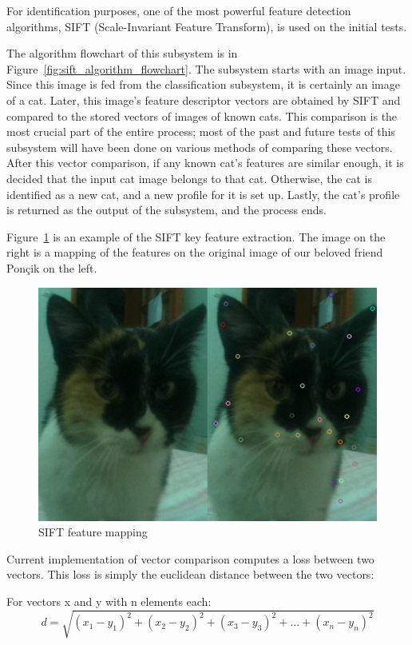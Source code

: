 For identification purposes, one of the most powerful feature detection algorithms, SIFT (Scale-Invariant Feature Transform), is used on the initial tests.

The algorithm flowchart of this subsystem is in Figure~\ref{fig:sift_algorithm_flowchart}. The subsystem starts with an image input. Since this image is fed from the classification subsystem, it is certainly an image of a cat. Later, this image's feature descriptor vectors are obtained by SIFT and compared to the stored vectors of images of known cats. This comparison is the most crucial part of the entire process; most of the past and future tests of this subsystem will have been done on various methods of comparing these vectors. After this vector comparison, if any known cat's features are similar enough, it is decided that the input cat image belongs to that cat. Otherwise, the cat is identified as a new cat, and a new profile for it is set up. Lastly, the cat's profile is returned as the output of the subsystem, and the process ends.

Figure~\ref{fig:sift_example} is an example of the SIFT key feature extraction. The image on the right is a mapping of the features on the original image of our beloved friend Ponçik on the left.

\begin{figure}[h!]
    \centering
    \includegraphics[width=0.8\linewidth]{img/sift_example.png}
    \caption{SIFT feature mapping}
    \label{fig:sift_example}
\end{figure}

Current implementation of vector comparison computes a loss between two vectors. This loss is simply the euclidean distance between the two vectors:

For vectors x and y with n elements each:
\begin{equation}
    d = \sqrt{(x_{1}-y_{1})^{2}+(x_{2}-y_{2})^{2}+(x_{3}-y_{3})^{2}+...+(x_{n}-y_{n})^{2}}
\end{equation}

